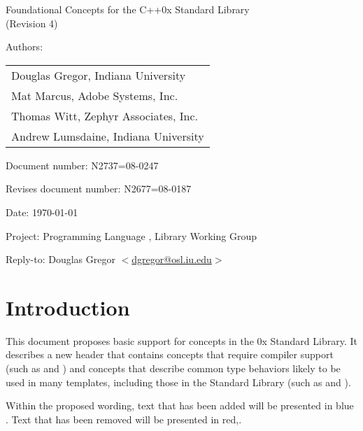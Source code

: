 \documentclass[american,twoside]{book}
\begin{document}
\raggedbottom

\begin{titlepage}
\begin{center}
\huge
Foundational Concepts for the C++0x Standard Library\\
(Revision 4)
\vspace{0.25in}
\end{center}

\normalsize
\vspace{0.25in}
\par\noindent Authors: 
\begin{tabular}[t]{l}
Douglas Gregor, Indiana University \\
Mat Marcus, Adobe Systems, Inc.\\
Thomas Witt, Zephyr Associates, Inc.\\
Andrew Lumsdaine, Indiana University
\end{tabular}\vspace{-6pt}

\par\noindent Document number: N2737=08-0247\vspace{-6pt}
\par\noindent Revises document number: N2677=08-0187\vspace{-6pt}
\par\noindent Date: \today\vspace{-6pt}
\par\noindent Project: Programming Language \Cpp{}, Library Working Group\vspace{-6pt}
\par\noindent Reply-to: Douglas Gregor $<$\href{mailto:dgregor@osl.iu.edu}{dgregor@osl.iu.edu}$>$\vspace{-6pt}

\section*{Introduction}
This document proposes basic support for concepts in the \Cpp0x
Standard Library. It describes a new header  that
contains concepts that require compiler support (such as
 and ) and concepts that describe
common type behaviors likely to be used in many templates, including
those in the Standard Library (such as  and
). 

Within the proposed wording, text that has been added
\textcolor{addclr}{will be presented in blue} . Text that has been removed will be
presented \textcolor{remclr}{in red},.


\end{titlepage}
\end{document}
